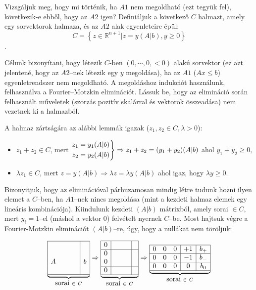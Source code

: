 Vizsgáljuk meg, hogy mi történik, ha $A1$ nem megoldható (ezt tegyük fel),
következik-e ebből, hogy az $A2$ igen? Definiáljuk a következő $C$ halmazt,
amely egy sorvektorok halmaza, és az $A2$ alak egyenleteire épül: \[ C= \left\{
z \in \mathbb{R}^{n+1} | z = y (A|b), y \geq 0 \right\}\].

Célunk bizonyítani, hogy létezik $C$-ben $(0, \cdots, 0 , <0)$ alakú sorvektor
(ez azt jelentené, hogy az $A2$--nek létezik egy $y$ megoldása), ha az $A1$
($Ax \leq b$) egyenletrendszer nem megoldható. A megoldáshoz indukciót
használunk, felhasználva a Fourier--Motzkin eliminációt. Lássuk be, hogy az
elimináció során felhasznált műveletek (szorzás pozitív skalárral és vektorok
összeadása) nem vezetnek ki a halmazból.

A halmaz zártságára az alábbi lemmák igazak ($z_1, z_2 \in C, \lambda>0$):

\begin{itemize}
  \item $z_1+z_2 \in C$, mert $\begin{rcases}
  z_1=y_1(A|b) \\
  z_2=y_2(A|b) \end{rcases} \Rightarrow z_1+z_2=(y_1+y_2)(A|b)$ ahol $y_1+y_2 \geq 0,$
  \item $\lambda z_1 \in C$, mert $
  z=y(A|b) \Rightarrow \lambda z = \lambda y (A|b)$ ahol igaz, hogy $\lambda y \geq 0$.
\end{itemize}

Bizonyitjuk, hogy az eliminációval párhuzamosan mindig létre tudunk hozni ilyen
elemet a $C$--ben, ha $A1$--nek nincs megoldása (mint a kezdeti halmaz elemek
egy lineáris kombinációja). Kiindulunk kezdeti $(A|b)$ mátrixból, amely sorai
$\in C$, mert $y_i=1$--el (máshol a vektor $0$) felvételt nyernek $C$--be. Most
hajtsuk végre a Fourier-Motzkin eliminációt $(A|b)$--re, úgy, hogy a nullákat
nem töröljük:

\begin{displaymath}
\underbrace{
\begin{array}{|cccc|c|}
\hline
 &  &  &  & \\
 &  & &  & \\
A &  & &  &b \\
 &  & & &\\
\hline
\end{array}}_{\mbox{sorai } \in~C}
\Rightarrow
\underbrace{
\begin{array}{|c|ccc|c|}
\hline
0 &  &  &  & \\
\hline
0 &  & &  & \\
0 &  & &  & \\
\hline
0 &  & & &\\
\hline
\end{array}}_{\mbox{sorai } \in~C}
\Rightarrow
\underbrace{
\begin{array}{|ccc|c|c|}
\hline
0 &  0 &0  & +1  & b_+\\
\hline
0 &  0& 0&  -1& b_-\\
\hline
0 &  0& 0& 0& b_0\\
\hline
\end{array}}_{\mbox{sorai } \in~C}
\end{displaymath}

